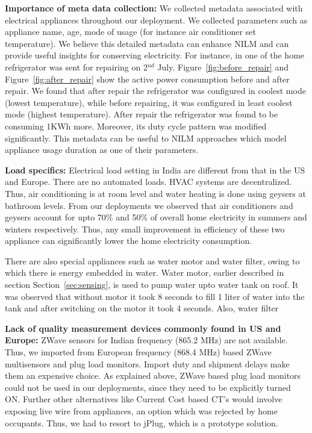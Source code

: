\documentclass[10pt]{sensys-proc}
\newcommand{\figref}[1]{Figure~\ref{#1}}
\newcommand{\secref}[1]{Section~\ref{#1}}
\begin{document}
\noindent \textbf{Importance of meta data collection:} We collected metadata associated with electrical appliances throughout our deployment. We collected parameters such as appliance name, age, mode of usage (for instance air conditioner set temperature). We believe this detailed metadata can enhance NILM and can provide useful insights for conserving electricity. For instance, in one of the home refrigerator was sent for repairing on 2$^{nd}$ July. \figref{fig:before_repair} and \figref{fig:after_repair} show the active power consumption before and after repair. We found that after repair the refrigerator was configured in coolest mode (lowest temperature), while before repairing, it was configured in least coolest mode (highest temperature). After repair the refrigerator was found to be consuming 1KWh more. Moreover, its duty cycle pattern was modified significantly. This metadata can be useful to NILM approaches which model appliance usage duration as one of their parameters.

\noindent \textbf{Load specifics:} Electrical load setting in India are different from that in the US and Europe. There are no automated loads. HVAC systems are decentralized. Thus, air conditioning is at room level and water heating is done using geysers at bathroom levels. From our deployments we observed that air conditioners and geysers account for upto 70\% and 50\% of overall home electricity in summers and winters respectively. Thus, any small improvement in efficiency of these two appliance can significantly lower the home electricity consumption.

\noindent There are also special appliances such as water motor and water filter, owing to which there is energy embedded in water. Water motor, earlier described in section \secref{sec:sensing}, is used to pump water upto water tank on roof. It was observed that without motor it took 8 seconds to fill 1 liter of water into the tank and after switching on the motor it took 4 seconds. Also, water filter 

\noindent \textbf{Lack of quality measurement devices commonly found in US and Europe:} ZWave sensors for Indian frequency (865.2 MHz) are not available. Thus, we imported from European frequency (868.4 MHz) based ZWave multisensors and plug load monitors. Import duty and shipment delays make them an expensive choice. As explained above, ZWave based plug load monitors could not be used in our deployments, since they need to be explicitly turned ON. Further other alternatives like Current Cost based CT's would involve exposing live wire from appliances, an option which was rejected by home occupants. Thus, we had to resort to jPlug, which is a prototype solution.
\end{document}
